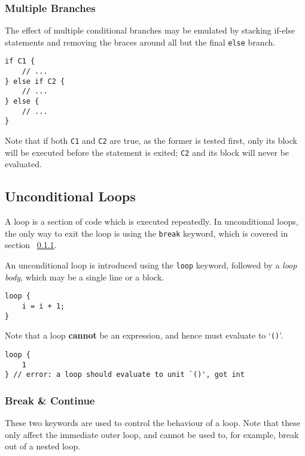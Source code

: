 \subsubsection{Multiple Branches}

The effect of multiple conditional branches may be emulated by stacking if-else statements and removing the braces around all but the final \texttt{else} branch.

\begin{lstlisting}[language=CustomLang]
if C1 {
    // ...
} else if C2 {
    // ...
} else {
    // ...
}
\end{lstlisting}

Note that if both \texttt{C1} and \texttt{C2} are true, as the former is tested first, only its block will be executed before the statement is exited;
\texttt{C2} and its block will never be evaluated.

\subsection{Unconditional Loops}

A loop is a section of code which is executed repeatedly.
In unconditional loops, the only way to exit the loop is using the \texttt{break} keyword, which is covered in section ~\ref{subsubsec:loop-control}.

An unconditional loop is introduced using the \texttt{loop} keyword, followed by a \textit{loop body}, which may be a single line or a block.

\begin{lstlisting}[language=CustomLang]
loop {
    i = i + 1;
}
\end{lstlisting}

Note that a loop \textbf{cannot} be an expression, and hence must evaluate to `\texttt{()}'.

\begin{lstlisting}[language=CustomLang]
loop {
    1
} // error: a loop should evaluate to unit `()', got int
\end{lstlisting}

\subsubsection{Break \& Continue}\label{subsubsec:loop-control}

These two keywords are used to control the behaviour of a loop.
Note that these only affect the immediate outer loop, and cannot be used to, for example, break out of a nested loop.

